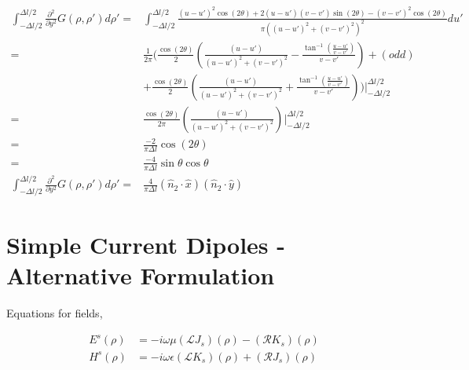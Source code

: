 \documentclass{article}
\newcommand{\0}{\varnothing}
\begin{document}
\begin{align*}
    \int_{-\Delta l/2}^{\Delta l/2}\frac{\partial^2}{\partial y^2}G(\rho, \rho')d\rho' =& \int_{-\Delta l/2}^{\Delta l/2}\frac{(u-u')^2\cos(2\theta) + 2(u-u')(v-v')\sin(2\theta)-(v-v')^2\cos(2\theta)}{\pi((u-u')^2 + (v-v')^2)^2}du'\\
    =& \frac{1}{2\pi}(\frac{\cos(2\theta)}{2}\left(\frac{(u-u')}{(u-u')^2+(v-v')^2} - \frac{\tan^{-1}(\frac{u-u'}{v-v'})}{v-v'}\right) + (odd)\\
    &+ \frac{\cos(2\theta)}{2}\left(\frac{(u-u')}{(u-u')^2+(v-v')^2} + \frac{\tan^{-1}(\frac{u-u'}{v-v'})}{v-v'}\right))|_{-\Delta l/2}^{\Delta l/2}\\
    =& \frac{\cos(2\theta)}{2\pi}\left(\frac{(u-u')}{(u-u')^2+(v-v')^2}\right)|_{-\Delta l/2}^{\Delta l/2}\\
    =& \frac{-2}{\pi\Delta l}\cos(2\theta)\\
    =& \frac{-4}{\pi\Delta l}\sin\theta\cos\theta\\
    \int_{-\Delta l/2}^{\Delta l/2}\frac{\partial^2}{\partial y^2}G(\rho, \rho')d\rho'=& \frac{4}{\pi\Delta l}(\hat{n}_2\cdot\hat{x})(\hat{n}_2\cdot\hat{y})
\end{align*}



\newpage
\section{Simple Current Dipoles - Alternative Formulation}

Equations for fields,

\begin{align*}
    E^s(\rho) &= -i\omega\mu(\mathcal{L}J_s)(\rho) - (\mathcal{R}K_s)(\rho)\\
    H^s(\rho) &= -i\omega\epsilon(\mathcal{L}K_s)(\rho) + (\mathcal{R}J_s)(\rho)
\end{align*}
\end{document}
